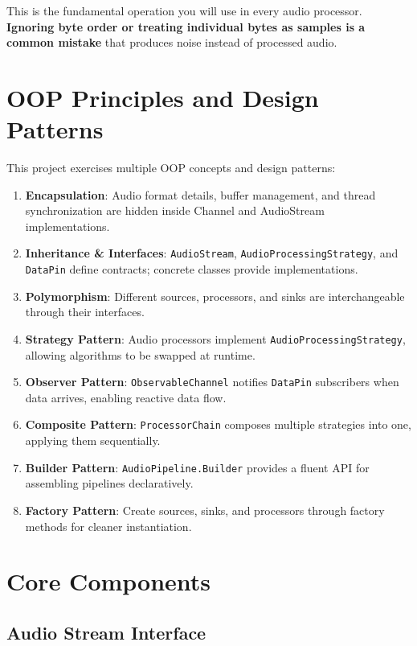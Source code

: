 \documentclass[a4paper,12pt]{article}
\begin{document}
This is the fundamental operation you will use in every audio processor.
\textbf{Ignoring byte order or treating individual bytes as samples is a common mistake}
that produces noise instead of processed audio.


\section{OOP Principles and Design Patterns}

This project exercises multiple OOP concepts and design patterns:

\begin{enumerate}
    \item \textbf{Encapsulation}: Audio format details, buffer management, and thread synchronization
          are hidden inside Channel and AudioStream implementations.
    \item \textbf{Inheritance \& Interfaces}: \texttt{AudioStream}, \texttt{AudioProcessingStrategy},
          and \texttt{DataPin} define contracts; concrete classes provide implementations.
    \item \textbf{Polymorphism}: Different sources, processors, and sinks are interchangeable
          through their interfaces.
    \item \textbf{Strategy Pattern}: Audio processors implement \texttt{AudioProcessingStrategy},
          allowing algorithms to be swapped at runtime.
    \item \textbf{Observer Pattern}: \texttt{ObservableChannel} notifies \texttt{DataPin} subscribers
          when data arrives, enabling reactive data flow.
    \item \textbf{Composite Pattern}: \texttt{ProcessorChain} composes multiple strategies into one,
          applying them sequentially.
    \item \textbf{Builder Pattern}: \texttt{AudioPipeline.Builder} provides a fluent API for
          assembling pipelines declaratively.
    \item \textbf{Factory Pattern}: Create sources, sinks, and processors through factory methods
          for cleaner instantiation.
\end{enumerate}


\section{Core Components}

\subsection{Audio Stream Interface}
\end{document}
